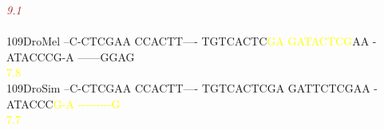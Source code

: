 \documentclass[11pt,twoside,reqno,a4paper]{article}
\begin{document}
{\hspace*{4\charwidth}\hspace*{7\charwidth}\hspace*{6\charwidth}\textit{\textcolor{brown}{9.1}}\hspace*{1\charwidth}\hspace*{1\charwidth}\hspace*{1\charwidth}\hspace*{1\charwidth}\hspace*{1\charwidth}\hspace*{1\charwidth}\\
\\
109\hspace*{1\charwidth}DroMel	--C-CTCGAA	CCACTT----	TGTCACTC\textcolor{yellow}{G}\textcolor{yellow}{A}	\textcolor{yellow}{G}\textcolor{yellow}{A}\textcolor{yellow}{T}\textcolor{yellow}{A}\textcolor{yellow}{C}\textcolor{yellow}{T}\textcolor{yellow}{C}\textcolor{yellow}{G}AA	-ATACCCG-A	------GGAG	\\
\hspace*{4\charwidth}\hspace*{7\charwidth}\hspace*{1\charwidth}\hspace*{1\charwidth}\hspace*{28\charwidth}\textcolor{yellow}{7.8}\hspace*{1\charwidth}\hspace*{1\charwidth}\hspace*{1\charwidth}\hspace*{1\charwidth}\\
109\hspace*{1\charwidth}DroSim	--C-CTCGAA	CCACTT----	TGTCACTCGA	GATTCTCGAA	-ATACCC\textcolor{yellow}{G}\textcolor{yellow}{-}\textcolor{yellow}{A}	\textcolor{yellow}{-}\textcolor{yellow}{-}\textcolor{yellow}{-}\textcolor{yellow}{-}\textcolor{yellow}{-}\textcolor{yellow}{-}\textcolor{yellow}{-}\textcolor{yellow}{-}\textcolor{yellow}{-}\textcolor{yellow}{G}	\\
\hspace*{4\charwidth}\hspace*{7\charwidth}\hspace*{1\charwidth}\hspace*{1\charwidth}\hspace*{1\charwidth}\hspace*{1\charwidth}\hspace*{47\charwidth}\textcolor{yellow}{7.7}\hspace*{1\charwidth}\hspace*{1\charwidth}\\
}
\end{document}
